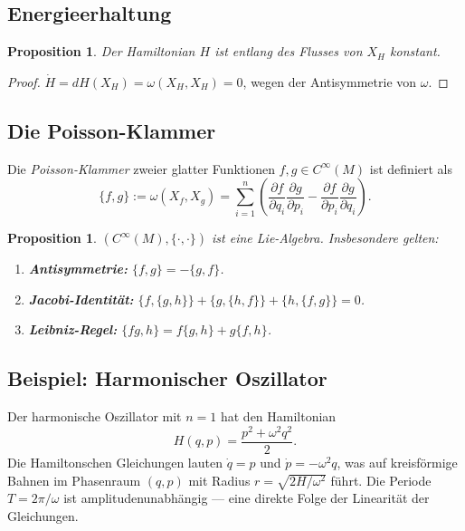 \documentclass[12pt,a4paper]{amsart}
\newtheorem{proposition}[theorem]{Proposition}
\theoremstyle{definition}
\begin{document}
\subsection{Energieerhaltung}

\begin{proposition}
Der Hamiltonian $H$ ist entlang des Flusses von $X_H$ konstant.
\end{proposition}
\begin{proof}
$\dot{H} = dH(X_H) = \omega(X_H, X_H) = 0$, wegen der Antisymmetrie von $\omega$.
\end{proof}

\subsection{Die Poisson-Klammer}

Die \emph{Poisson-Klammer} zweier glatter Funktionen $f, g \in C^\infty(M)$
ist definiert als
\begin{equation}\label{eq:poisson}
  \{f, g\} := \omega(X_f, X_g) = \sum_{i=1}^{n}
  \left(\frac{\partial f}{\partial q_i}\frac{\partial g}{\partial p_i}
  - \frac{\partial f}{\partial p_i}\frac{\partial g}{\partial q_i}\right).
\end{equation}

\begin{proposition}
$(C^\infty(M), \{\cdot,\cdot\})$ ist eine Lie-Algebra.  Insbesondere gelten:
\begin{enumerate}[label=(\roman*)]
  \item \textbf{Antisymmetrie:} $\{f,g\} = -\{g,f\}$.
  \item \textbf{Jacobi-Identität:} $\{f,\{g,h\}\} + \{g,\{h,f\}\} + \{h,\{f,g\}\} = 0$.
  \item \textbf{Leibniz-Regel:} $\{fg, h\} = f\{g,h\} + g\{f,h\}$.
\end{enumerate}
\end{proposition}

\subsection{Beispiel: Harmonischer Oszillator}

Der harmonische Oszillator mit $n = 1$ hat den Hamiltonian
\[
  H(q, p) = \frac{p^2 + \omega^2 q^2}{2}.
\]
Die Hamiltonschen Gleichungen lauten $\dot{q} = p$ und $\dot{p} = -\omega^2 q$,
was auf kreisförmige Bahnen im Phasenraum $(q, p)$ mit Radius
$r = \sqrt{2H/\omega^2}$ führt.  Die Periode $T = 2\pi/\omega$ ist
amplitudenunabhängig --- eine direkte Folge der Linearität der Gleichungen.
\end{document}
